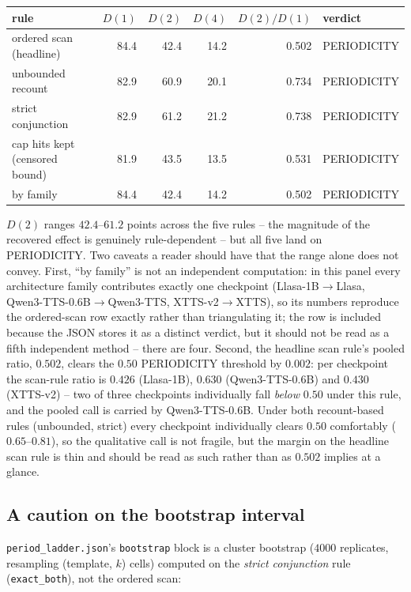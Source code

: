 \documentclass[11pt]{article}
\begin{document}
\begin{center}
\begin{tabular}{@{}lrrrrl@{}}
\toprule
rule & $D(1)$ & $D(2)$ & $D(4)$ & $D(2)/D(1)$ & verdict \\
\midrule
ordered scan (headline)     & 84.4 & 42.4 & 14.2 & 0.502 & PERIODICITY \\
unbounded recount           & 82.9 & 60.9 & 20.1 & 0.734 & PERIODICITY \\
strict conjunction          & 82.9 & 61.2 & 21.2 & 0.738 & PERIODICITY \\
cap hits kept (censored bound) & 81.9 & 43.5 & 13.5 & 0.531 & PERIODICITY \\
by family                   & 84.4 & 42.4 & 14.2 & 0.502 & PERIODICITY \\
\bottomrule
\end{tabular}
\end{center}

\noindent $D(2)$ ranges $42.4$--$61.2$ points across the five rules -- the
magnitude of the recovered effect is genuinely rule-dependent -- but all five
land on PERIODICITY. Two caveats a reader should have that the range alone
does not convey. First, ``by family'' is not an independent computation: in
this panel every architecture family contributes exactly one checkpoint
(Llasa-1B$\to$Llasa, Qwen3-TTS-0.6B$\to$Qwen3-TTS, XTTS-v2$\to$XTTS), so its
numbers reproduce the ordered-scan row exactly rather than triangulating it;
the row is included because the JSON stores it as a distinct verdict, but it
should not be read as a fifth independent method -- there are four. Second,
the headline scan rule's pooled ratio, $0.502$, clears the $0.50$
PERIODICITY threshold by $0.002$: per checkpoint the scan-rule ratio is
$0.426$ (Llasa-1B), $0.630$ (Qwen3-TTS-0.6B) and $0.430$ (XTTS-v2) -- two of
three checkpoints individually fall \emph{below} $0.50$ under this rule, and
the pooled call is carried by Qwen3-TTS-0.6B. Under both recount-based rules
(unbounded, strict) every checkpoint individually clears $0.50$
comfortably ($0.65$--$0.81$), so the qualitative call is not fragile, but the
margin on the headline scan rule is thin and should
be read as such rather than as $0.502$ implies at a glance.

\subsection{A caution on the bootstrap interval}

\texttt{period\_ladder.json}'s \texttt{bootstrap} block is a cluster
bootstrap ($4000$ replicates, resampling (template, $k$) cells) computed on
the \emph{strict conjunction} rule (\texttt{exact\_both}), not the ordered
scan:
\end{document}
